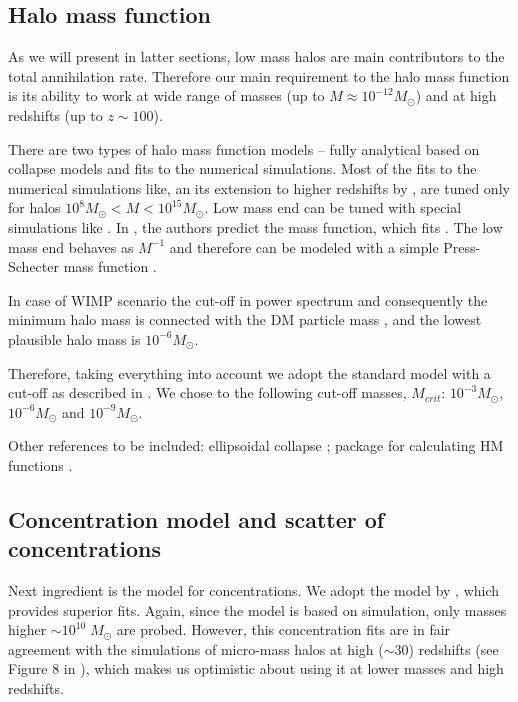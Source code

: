 \subsection{Halo mass function}

As we will present in latter sections, low mass halos are main contributors to the total annihilation rate. Therefore our main requirement to the halo mass function is its ability to work at wide range of masses (up to $M \approx 10^{-12}M_\odot$) and at high redshifts (up to $z \sim 100$). 

There are two types of halo mass function models -- fully analytical based on collapse models and fits to the numerical simulations. Most of the fits to the numerical simulations like, \citet{Tinker_2008} an its extension to higher redshifts by \citet{Behroozi_2013}, are tuned only for halos $10^{8}M_\odot < M < 10^{15}M_\odot$. Low mass end can be tuned with special simulations like \citet{Diemand_2005}. In \citet{Schneider_2013}, the authors predict the mass function, which fits \citet{Diemand_2005}. The low mass end behaves as $M^{-1}$ and therefore can be modeled with a simple Press-Schecter mass function \citet{Press_1974}.

In case of WIMP scenario the cut-off in power spectrum and consequently the minimum halo mass is connected with the DM particle mass \cite{Green_2004, Profumo_2006}, and the lowest plausible halo mass is $10^{-6}M_\odot$.

Therefore, taking everything into account we adopt the standard \citet{Press_1974} model with a cut-off as described in \citet{Diemand_2005}. We chose to the following cut-off masses, $M_{crit}$: $10^{-3}M_\odot$, $10^{-6}M_\odot$ and $10^{-9}M_\odot$.

Other references to be included:
ellipsoidal collapse \citep{Sheth_2001}; package for calculating HM functions \cite{Murray_2013}.

\subsection{Concentration model and scatter of concentrations}

Next ingredient is the model for concentrations. We adopt the model by \citet{Diemer_2015}, which provides superior fits. Again, since the model is based on simulation, only masses higher $\sim10^{10}\;M_\odot$ are probed. However, this concentration fits are in fair agreement with the simulations of micro-mass halos at high ($\sim30$) redshifts (see Figure 8 in \citet{Diemer_2015}), which makes us optimistic about using it at lower masses and high redshifts.

